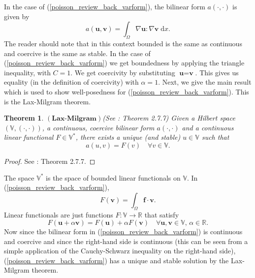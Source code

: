 \documentclass[12pt,a4paper]{article}
\newtheorem{theorem}{Theorem}[section]
\theoremstyle{definition}
\begin{document}
In the case of (\ref{poisson_review_back_varform}), the bilinear form $a\left(\cdot,\cdot\right)$ is given by 
\begin{equation}
a\left(\textbf{u},\textbf{v}\right)=\int_{\Omega}\nabla \textbf{u} : \nabla \textbf{v}\;\mathrm{d}x. \nonumber
\end{equation}
The reader should note that in this context bounded is the same as continuous and coercive is the same as stable.  In the case of (\ref{poisson_review_back_varform}) we get boundedness by applying the triangle inequality, with $C=1$.  We get coercivity by substituting $\textbf{u}=\textbf{v}$.  This gives us equality (in the definition of coercivity) with $\alpha=1$.  Next, we give the main result which is used to show well-posedness for (\ref{poisson_review_back_varform}).  This is the Lax-Milgram theorem.
\begin{theorem}{$\left(\textbf{Lax-Milgram}\right)$}\label{theorem_Lax_Milgram}(See \cite{brenner2007mathematical}: Theorem 2.7.7)
	Given a Hilbert space $\left(\mathbb{V},\left(\cdot,\cdot\right)\right)$, a continuous, coercive bilinear form $a\left(\cdot,\cdot\right)$ and a continuous linear functional $F\in \mathbb{V}^*$, there exists a unique (and stable) $u\in\mathbb{V}$ such that
	\begin{equation}
a\left(u,v\right)=F\left(v\right)\quad\forall v\in \mathbb{V}.
	\end{equation}
\end{theorem}
\begin{proof}
	See \cite{brenner2007mathematical}: Theorem 2.7.7.
\end{proof}
The space $\mathbb{V}^*$ is the space of bounded linear functionals on $\mathbb{V}$.  In (\ref{poisson_review_back_varform}),
\begin{equation}
F\left(\textbf{v}\right)=\int_{\Omega}\textbf{f}\cdot\textbf{v}.
\end{equation}
Linear functionals are just functions $F:\mathbb{V}\rightarrow\mathbb{R}$ that satisfy
\begin{equation}
F\left(\textbf{u}+\alpha\textbf{v}\right)=F\left(\textbf{u}\right)+\alpha F\left(\textbf{v}\right) \quad\forall \textbf{u},\textbf{v}\in\mathbb{V},\,\alpha\in\mathbb{R}.\nonumber
\end{equation}
Now since the bilinear form in (\ref{poisson_review_back_varform}) is continuous and coercive and since the right-hand side is continuous (this can be seen from a simple application of the Cauchy-Schwarz inequality on the right-hand side), (\ref{poisson_review_back_varform}) has a unique and stable solution by the Lax-Milgram theorem.
\end{document}
